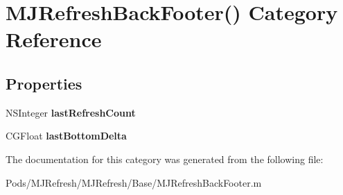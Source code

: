 \hypertarget{category_m_j_refresh_back_footer_07_08}{}\section{M\+J\+Refresh\+Back\+Footer() Category Reference}
\label{category_m_j_refresh_back_footer_07_08}
\subsection*{Properties}
\begin{DoxyCompactItemize}
\item 
\mbox{\label{category_m_j_refresh_back_footer_07_08_ad2dfb7217fe952f50b098d6373607098}} 
N\+S\+Integer {\bfseries last\+Refresh\+Count}
\item 
\mbox{\label{category_m_j_refresh_back_footer_07_08_a349a86769466e119486530c9b27600bd}} 
C\+G\+Float {\bfseries last\+Bottom\+Delta}
\end{DoxyCompactItemize}


The documentation for this category was generated from the following file\+:\begin{DoxyCompactItemize}
\item 
Pods/\+M\+J\+Refresh/\+M\+J\+Refresh/\+Base/M\+J\+Refresh\+Back\+Footer.\+m\end{DoxyCompactItemize}
